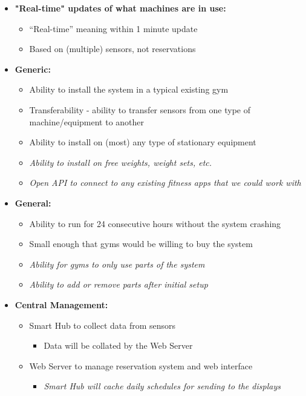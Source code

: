 \documentclass[letterpaper,11pt]{./templates/texMemo} %
\begin{document}
\begin{itemize}
    \item{\textbf{"Real-time" updates of what machines are in use:}}
    \begin{itemize}
        \item{“Real-time” meaning within 1 minute update}
        \item{Based on (multiple) sensors, not reservations}
    \end{itemize}

    \item{\textbf{Generic:}}
    \begin{itemize}
        \item{Ability to install the system in a typical existing gym}
        \item{Transferability - ability to transfer sensors from one type of machine/equipment to another}
        \item{Ability to install on (most) any type of stationary equipment}
        \item{\textit{Ability to install on free weights, weight sets, etc.}}
        \item{\textit{Open API to connect to any existing fitness apps that we could work with}}
    \end{itemize}

    \item{\textbf{General:}}
    \begin{itemize}
        \item{Ability to run for 24 consecutive hours without the system crashing}
        \item{Small enough that gyms would be willing to buy the system}
        \item{\textit{Ability for gyms to only use parts of the system}}
        \item{\textit{Ability to add or remove parts after initial setup}}
    \end{itemize}

    \item{\textbf{Central Management:}}
    \begin{itemize}
        \item{Smart Hub to collect data from sensors}
        \begin{itemize}
            \item{Data will be collated by the Web Server}
        \end{itemize}
        \item{Web Server to manage reservation system and web interface}
        \begin{itemize}
            \item{\textit{Smart Hub will cache daily schedules for sending to the displays}}
        \end{itemize}
    \end{itemize}


\end{itemize}
\end{document}
